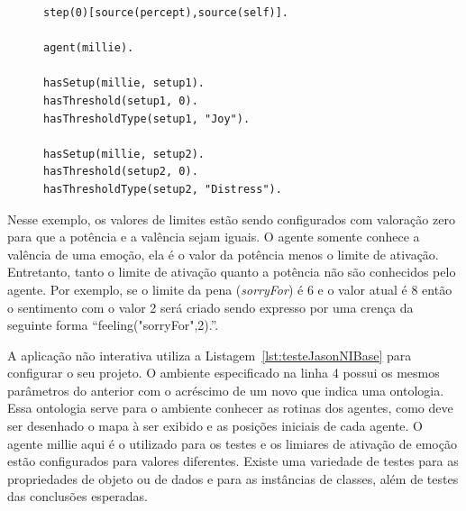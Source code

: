 \lstset{linewidth=80mm}
\begin{figure}
	\begin{lstlisting}[frame=trbl,
caption=Parte do código do agente para aplicação interativa de teste,
label=lst:testeJasonIntSetup]
step(0)[source(percept),source(self)].

agent(millie).

hasSetup(millie, setup1).
hasThreshold(setup1, 0).
hasThresholdType(setup1, "Joy").

hasSetup(millie, setup2).
hasThreshold(setup2, 0).
hasThresholdType(setup2, "Distress").
	\end{lstlisting}
\end{figure}

Nesse exemplo, os valores de limites estão sendo configurados com valoração
zero para que a potência e a valência sejam iguais. O agente somente conhece
a valência de uma emoção, ela é o valor da potência menos o limite de
ativação. Entretanto, tanto o limite de ativação quanto a potência não são
conhecidos pelo agente. Por exemplo, se o limite da pena (\emph{sorryFor}) é 6
e o valor atual é 8 então o sentimento com o valor 2 será criado sendo
expresso por uma crença da seguinte forma ``feeling("sorryFor",2).''.


\begin{center}
    \begin{minipage}{140mm}
	\lstset{linewidth=140mm}
	
    \end{minipage}
\end{center}

A aplicação não interativa utiliza a Listagem~\ref{lst:testeJasonNIBase} para
configurar o seu projeto. O ambiente especificado na linha 4 possui os mesmos
parâmetros do anterior com o acréscimo de um novo que indica uma ontologia.
Essa ontologia serve para o ambiente conhecer as rotinas dos agentes, como
deve ser desenhado o mapa à ser exibido e as posições iniciais de cada
agente. O agente millie aqui é o utilizado para os testes e os limiares de
ativação de emoção estão configurados para valores diferentes. Existe uma
variedade de testes para as propriedades de objeto ou de dados e para as
instâncias de classes, além de testes das conclusões esperadas.

